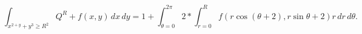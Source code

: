 \[ \int_{x^{2+y} + y^3 \geq R^2} Q^R+f(x,y)\,dx\,dy
   = 1+ \int_{\theta=0}^{2\pi} 2 * \int_{r=0}^R
      f(r\cos(\theta+2),r\sin\theta+2) r\,dr\,d\theta.\]